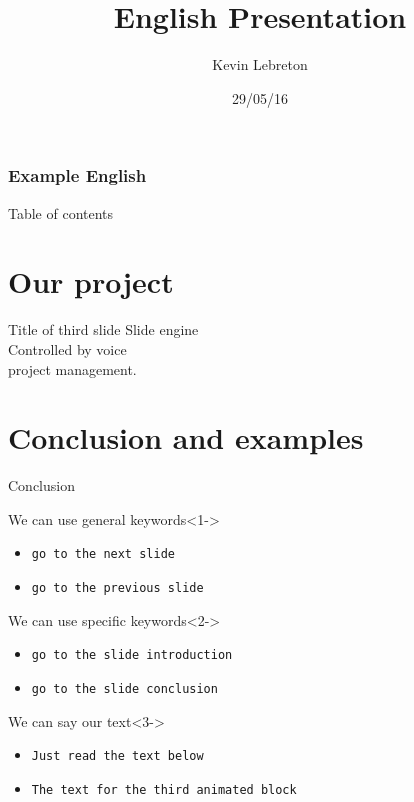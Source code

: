 \documentclass[english]{beamer}
\title{English Presentation}
\author{Kevin Lebreton}
\date{29/05/16}
\begin{document}
  \begin{frame}
 \frametitle{Example English}
	    \titlepage
  \end{frame}

  
  \begin{frame}{Table of contents}
	\tableofcontents
  \end{frame}

  \section{Our project}
  \begin{frame}{Title of third slide}
    Slide engine \\ 
    Controlled by voice \\ 
    project management.
  \end{frame}

  \section{Conclusion and examples}
  \begin{frame}{Conclusion}
	\begin{block}{We can use general keywords}<1->
	  	\begin{itemize}
	  		\item {\tt go to the next slide}   		
    		\item {\tt go to the previous slide}
		\end{itemize}
	\end{block}

	\begin{block}{We can use specific keywords}<2->
	  	\begin{itemize}
	  		\item {\tt go to the slide introduction}   		
    		\item {\tt go to the slide conclusion}
		\end{itemize}
	\end{block}

	\begin{block}{We can say our text}<3->
	  	\begin{itemize}
	  		\item {\tt Just read the text below}   		
    		\item {\tt The text for the third animated block}
		\end{itemize}
	\end{block}
  \end{frame}
  
  {\1
\begin{frame}
\end{frame}
}
\end{document}
